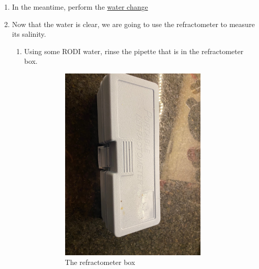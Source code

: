 \documentclass{report}
\begin{document}
\begin{enumerate}
    \item In the meantime, perform the \hyperref[sec:reefwc]{water change}
    \item Now that the water is clear, we are going to use the refractometer to measure its salinity.
    \begin{enumerate}[I]
    \label{sec:refrinstructions}
        \item Using some RODI water, rinse the pipette that is in the refractometer box.
        \begin{figure}[H]
            \centering
            \begin{subfigure}{0.5\textwidth}
                \centering
                \includegraphics[width=0.9\textwidth]{RefractometerBox.jpg}
                \caption{The refractometer box}
            \end{subfigure}%
            \begin{subfigure}{0.5\textwidth}
                \centering

\end{subfigure}
\end{figure}
\end{enumerate}
\end{enumerate}
\end{document}
